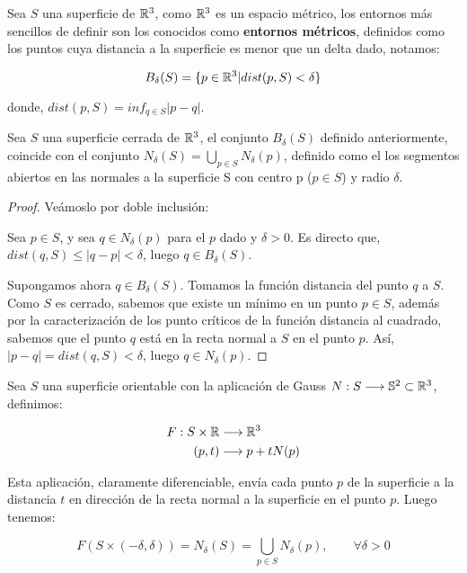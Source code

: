 Sea $S$ una superficie de $\mathbb{R}^3$, como $\mathbb{R}^3$ es un espacio métrico, los entornos más sencillos de definir son los conocidos como \textbf{entornos métricos}, definidos como los puntos cuya distancia a la superficie es menor que un delta dado, notamos:

\begin{equation*}
    B_\delta(S)=\{p\in \mathbb{R}^3 | dist(p,S) < \delta\}
\end{equation*}

donde, $dist(p,S) = inf_{q\in S}|p-q|$.

\begin{lemma}
Sea $S$ una superficie cerrada de $\mathbb{R}^3$, el conjunto $B_\delta(S)$ definido anteriormente, coincide con el conjunto $N_\delta(S)=\bigcup_{p\in S}N_\delta(p)$, definido como el los segmentos abiertos en las normales a la superficie S con centro p ($p \in S$) y radio $\delta$.
\end{lemma}
\begin{proof}
Veámoslo por doble inclusión:

Sea $p \in S$, y sea $q \in N_\delta(p)$ para el $p$ dado y $\delta > 0$. Es directo que, $dist(q,S) \leq |q-p| < \delta$, luego $q \in B_\delta(S)$.

Supongamos ahora $q \in B_\delta(S)$. Tomamos la función distancia del punto $q$ a $S$. Como $S$ es cerrado, sabemos que existe un mínimo en un punto $p \in S$, además por la caracterización de los punto críticos de la función distancia al cuadrado, sabemos que el punto $q$ está en la recta normal a $S$ en el punto $p$. Así, $|p-q| = dist(q,S) < \delta$, luego $q \in N_\delta(p)$.
\end{proof}

Sea $S$ una superficie orientable con la aplicación de Gauss $N: S \longrightarrow \mathbb{S}^2 \subset \mathbb{R}^3$, definimos:

\begin{align*}
    F: S \times \mathbb{R} &\longrightarrow \mathbb{R}^3 \\
    (p,t) &\longrightarrow p + tN(p)
\end{align*}

Esta aplicación, claramente diferenciable, envía cada punto $p$ de la superficie a la distancia $t$ en dirección de la recta normal a la superficie en el punto $p$. Luego tenemos:

\begin{equation*}
    F(S \times (-\delta, \delta)) = N_\delta(S)=\bigcup_{p\in S} N_\delta(p), \qquad \forall \delta > 0
\end{equation*}

